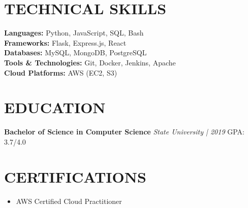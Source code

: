 \documentclass[11pt]{article}
\begin{document}
\section*{TECHNICAL SKILLS}
\textbf{Languages:} Python, JavaScript, SQL, Bash \\
\textbf{Frameworks:} Flask, Express.js, React \\
\textbf{Databases:} MySQL, MongoDB, PostgreSQL \\
\textbf{Tools \& Technologies:} Git, Docker, Jenkins, Apache \\
\textbf{Cloud Platforms:} AWS (EC2, S3)

\section*{EDUCATION}
\textbf{Bachelor of Science in Computer Science} \hfill \textit{State University | 2019}
GPA: 3.7/4.0

\section*{CERTIFICATIONS}
\begin{itemize}
    \item AWS Certified Cloud Practitioner
\end{itemize}
\end{document}
